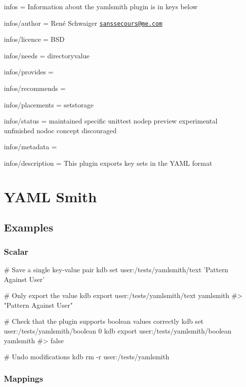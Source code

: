 
\begin{DoxyItemize}
\item infos = Information about the yamlsmith plugin is in keys below
\item infos/author = René Schwaiger \href{mailto:sanssecours@me.com}{\tt sanssecours@me.\+com}
\item infos/licence = B\+SD
\item infos/needs = directoryvalue
\item infos/provides =
\item infos/recommends =
\item infos/placements = setstorage
\item infos/status = maintained specific unittest nodep preview experimental unfinished nodoc concept discouraged
\item infos/metadata =
\item infos/description = This plugin exports key sets in the Y\+A\+ML format
\end{DoxyItemize}\hypertarget{autotoc_md889_src_plugins_yamlsmith_README_md}{}\section{Y\+A\+M\+L Smith}\label{autotoc_md889_src_plugins_yamlsmith_README_md}
\hypertarget{autotoc_md889_autotoc_md890}{}\subsection{Examples}\label{autotoc_md889_autotoc_md890}
\hypertarget{autotoc_md889_autotoc_md891}{}\subsubsection{Scalar}\label{autotoc_md889_autotoc_md891}

\begin{DoxyCode}
# Save a single key-value pair
kdb set user:/tests/yamlsmith/text 'Pattern Against User'

# Only export the value
kdb export user:/tests/yamlsmith/text yamlsmith
#> "Pattern Against User"

# Check that the plugin supports boolean values correctly
kdb set user:/tests/yamlsmith/boolean 0
kdb export user:/tests/yamlsmith/boolean yamlsmith
#> false

# Undo modifications
kdb rm -r user:/tests/yamlsmith
\end{DoxyCode}
\hypertarget{autotoc_md889_autotoc_md892}{}\subsubsection{Mappings}\label{autotoc_md889_autotoc_md892}

